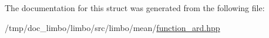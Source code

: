 The documentation for this struct was generated from the following file\+:\begin{DoxyCompactItemize}
\item 
/tmp/doc\+\_\+limbo/limbo/src/limbo/mean/\hyperlink{function__ard_8hpp}{function\+\_\+ard.\+hpp}\end{DoxyCompactItemize}
